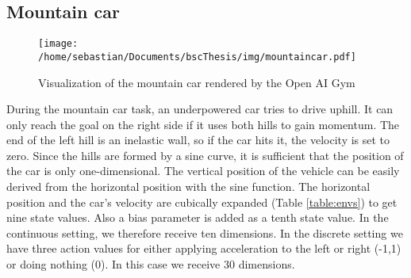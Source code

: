 \subsection{Mountain car}

\begin{wrapfigure}{R}{0.5\textwidth}
    \centering
    \texttt{[image: /home/sebastian/Documents/bscThesis/img/mountaincar.pdf]}
    \caption{Visualization of the mountain car rendered by the Open AI Gym\label{fig:mountaincarPygym}}
\end{wrapfigure}

During the mountain car task, an underpowered car tries to drive uphill. It can only reach the goal on the right side if it uses both hills to gain momentum. The end of the left hill is an inelastic wall, so if the car hits it, the velocity is set to zero. Since the hills are formed by a sine curve, it is sufficient that the position of the car is only one-dimensional. The vertical position of the vehicle can be easily derived from the horizontal position with the sine function. The horizontal position and the car's velocity are cubically expanded (Table \ref{table:envs}) to get nine state values. Also a bias parameter is added as a tenth state value. In the continuous setting, we therefore receive ten dimensions. In the discrete setting we have three action values for either applying acceleration to the left or right (-1,1) or doing nothing (0). In this case we receive 30 dimensions.



%
%
